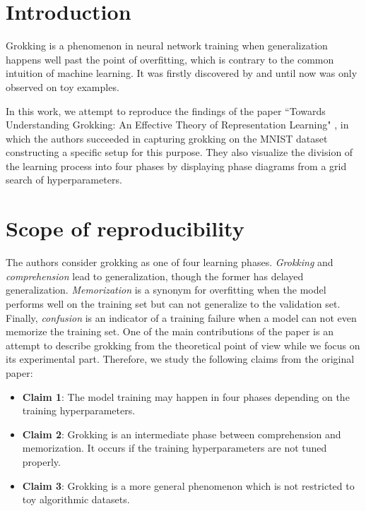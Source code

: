 \section{Introduction}

Grokking is a phenomenon in neural network training when generalization happens well past the point of overfitting, which is contrary to the common intuition of machine learning. It was firstly discovered by \cite{grokking_first} and until now was only observed on toy examples.

In this work, we attempt to reproduce the findings of the paper ``Towards Understanding Grokking: An Effective Theory of Representation Learning" \cite{understanding_grokking}, in which the authors succeeded in capturing grokking on the MNIST dataset constructing a specific setup for this purpose. They also visualize the division of the learning process into four phases by displaying phase diagrams from a grid search of hyperparameters. 

\section{Scope of reproducibility}
\label{sec:claims}
The authors consider grokking as one of four learning phases. \emph{Grokking} and \emph{comprehension} lead to generalization, though the former has delayed generalization. \emph{Memorization} is a synonym for overfitting when the model performs well on the training set but can not generalize to the validation set. Finally, \emph{confusion} is an indicator of a training failure when a model can not even memorize the training set. One of the main contributions of the paper is an attempt to describe grokking from the theoretical point of view while we focus on its experimental part. Therefore, we study the following claims from the original paper:
\begin{itemize}
    \item \textbf{Claim 1}: The model training may happen in four phases depending on the training hyperparameters. \label{claim:1}
    \item \textbf{Claim 2}: Grokking is an intermediate phase between comprehension and memorization. It occurs if the training hyperparameters are not tuned properly.
    \label{claim:2}
    \item \textbf{Claim 3}: Grokking is a more general phenomenon which is not restricted to toy algorithmic datasets. \label{claim:3}
\end{itemize}

